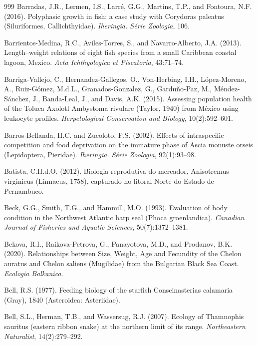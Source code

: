\begin{thebibliography}{999}
Barradas, J.R., Lermen, I.S., Larr{\'e}, G.G., Martins, T.P., and Fontoura, N.F. (2016). Polyphasic growth in fish: a case study with Corydoras paleatus (Siluriformes, Callichthyidae). \textit{Iheringia. S{\'e}rie Zoologia}, 106.

Barrientos-Medina, R.C., Aviles-Torres, S., and Navarro-Alberto, J.A. (2013). Length--weight relations of eight fish species from a small Caribbean coastal lagoon, Mexico. \textit{Acta Ichthyologica et Piscatoria}, 43:71--74.

Barriga-Vallejo, C., Hernandez-Gallegos, O., Von-Herbing, I.H., L{\'o}pez-Moreno, A., Ruiz-G{\'o}mez, M.d.L., Granados-Gonzalez, G., Gardu{\~n}o-Paz, M., M{\'e}ndez-S{\'a}nchez, J., Banda-Leal, J., and Davis, A.K. (2015). Assessing population health of the Toluca Axolotl Ambystoma rivulare (Taylor, 1940) from M{\'e}xico using leukocyte profiles. \textit{Herpetological Conservation and Biology}, 10(2):592--601.

Barros-Bellanda, H.C. and Zucoloto, F.S. (2002). Effects of intraspecific competition and food deprivation on the immature phase of Ascia monuste orseis (Lepidoptera, Pieridae). \textit{Iheringia. S{\'e}rie Zoologia}, 92(1):93--98.

Batista, C.H.d.O. (2012). Biologia reprodutiva do mercador, Anisotremus virginicus (Linnaeus, 1758), capturado no litoral Norte do Estado de Pernambuco.

Beck, G.G., Smith, T.G., and Hammill, M.O. (1993). Evaluation of body condition in the Northwest Atlantic harp seal (Phoca groenlandica). \textit{Canadian Journal of Fisheries and Aquatic Sciences}, 50(7):1372--1381.

Bekova, R.I., Raikova-Petrova, G., Panayotova, M.D., and Prodanov, B.K. (2020). Relationships between Size, Weight, Age and Fecundity of the Chelon auratus and Chelon saliens (Mugilidae) from the Bulgarian Black Sea Coast. \textit{Ecologia Balkanica}.

Bell, R.S. (1977). Feeding biology of the starfish Conscinasterias calamaria (Gray), 1840 (Asteroidea: Asteriidae).

Bell, S.L., Herman, T.B., and Wassersug, R.J. (2007). Ecology of Thamnophis sauritus (eastern ribbon snake) at the northern limit of its range. \textit{Northeastern Naturalist}, 14(2):279--292.


\end{thebibliography}
